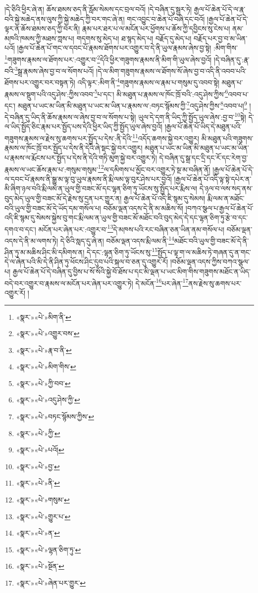 །དེ་ཅིའི་ཕྱིར་ཞེ་ན། ཆོས་ཐམས་ཅད་ནི་རློམ་སེམས་དང་བྲལ་བའོ། །དེ་བཞིན་དུ་སྦྱར་ཏེ། རྒྱལ་པོ་ཆེན་པོ་དེ་ལ་རྣ་བའི་སྐྱེ་མཆེད་ནས་ལུས་ཀྱི་སྐྱེ་མཆེད་ཀྱི་བར་གང་ཞེ་ན། གང་འབྱུང་བ་ཆེན་པོ་བཞི་དང་བའོ། །རྒྱལ་པོ་ཆེན་པོ་དེ་ལྟར་ན་ཆོས་ཐམས་ཅད་ཀྱི་བར་ནི། རྣམ་པར་ཐར་པ་ལ་མངོན་པར་ཕྱོགས་པ་ཆོས་ཀྱི་དབྱིངས་སུ་ངེས་པ། ནམ་མཁའི་ཁམས་ཀྱི་མཐས་ཀླས་པ། གདགས་སུ་མེད་པ། ཐ་སྙད་མེད་པ། བརྗོད་དུ་མེད་པ། བརྗོད་པར་བྱ་བ་མ་ཡིན་པའོ། །རྒྱལ་པོ་ཆེན་པོ་གང་ལ་དབང་པོ་རྣམས་ཐོགས་པར་འགྱུར་བ་དེ་ནི་ཡུལ་རྣམས་ཞེས་བྱ་སྟེ། :མིག་གིས་\footnote{«སྣར་»«པེ་»མིག་ནི་}གཟུགས་རྣམས་ལ་ཐོགས་པར་:འགྱུར་བ་\footnote{«སྣར་»«པེ་»འགྱུར་བས་}དེའི་ཕྱིར་གཟུགས་རྣམས་ནི་མིག་གི་ཡུལ་ཞེས་བྱའོ། །དེ་བཞིན་དུ་:རྣ་བའི་\footnote{«སྣར་»«པེ་»རྣ་བ་ནི་}སྒྲ་རྣམས་ཞེས་བྱ་བ་ལ་སོགས་པའོ། །དེ་ལ་མིག་གཟུགས་རྣམས་ལ་ཐོགས་སོ་ཞེས་བྱ་བ་འདི་ནི་འབབ་པའི་ཐོགས་པར་འགྱུར་བར་བསྟན་ཏེ། འདི་ལྟར་:མིག་ནི་\footnote{«སྣར་»«པེ་»མིག་གིས་}གཟུགས་རྣམས་ལ་རྣམ་པ་གསུམ་དུ་འབབ་སྟེ། མཐུན་པ་རྣམས་ལ་སྡུག་པའི་འདུ་ཤེས་:ཀྱིས་འབབ་\footnote{«སྣར་»«པེ་»ཀྱི་བབ་}པ་དང་། མི་མཐུན་པ་རྣམས་ལ་ཁོང་ཁྲོ་བའི་:འདུ་ཤེས་ཀྱིས་\footnote{«སྣར་»«པེ་»འདུ་ཤེས་ཀྱི་}འབབ་པ་དང་། མཐུན་པ་ཡང་མ་ཡིན་མི་མཐུན་པ་ཡང་མ་ཡིན་པ་རྣམས་ལ་:བཏང་སྙོམས་ཀྱི་\footnote{«སྣར་»«པེ་»བཏང་སྙོམས་ཀྱིས་}འདུ་ཤེས་ཀྱིས་\footnote{«སྣར་»«པེ་»ཀྱི་}འབབ་པ།\footnote{«སྣར་»«པེ་»པའོ།} །དེ་བཞིན་དུ་ཡིད་ནི་ཆོས་རྣམས་ལ་ཞེས་བྱ་བ་ལ་སོགས་པ་སྟེ། ཡུལ་དེ་དག་ནི་ཡིད་ཀྱི་སྤྱོད་ཡུལ་ཞེས་:བྱ་བ་\footnote{«སྣར་»«པེ་»བྱ་}སྟེ། དེ་ལ་ཡིད་སྤྱོད་ཅིང་རྣམ་པར་སྤྱོད་པས་དེའི་ཕྱིར་ཡིད་ཀྱི་སྤྱོད་ཡུལ་ཞེས་བྱའོ། །རྒྱལ་པོ་ཆེན་པོ་ཡིད་དེ་མཐུན་པའི་གཟུགས་རྣམས་ལ་རྗེས་སུ་ཆགས་པར་སྤྱོད་པ་དེས་:ནི་དེའི་\footnote{«སྣར་»«པེ་»ནི་}འདོད་ཆགས་སྐྱེ་བར་འགྱུར། མི་མཐུན་པའི་གཟུགས་རྣམས་ལ་ཁོང་ཁྲོ་བར་སྤྱོད་པ་དེས་ནི་དེའི་ཞེ་སྡང་སྐྱེ་བར་འགྱུར། མཐུན་པ་ཡང་མ་ཡིན་མི་མཐུན་པ་ཡང་མ་ཡིན་པ་རྣམས་ལ་རྨོངས་པར་སྤྱོད་པ་དེས་ནི་དེའི་གཏི་མུག་སྐྱེ་བར་འགྱུར་ཏེ། དེ་བཞིན་དུ་སྒྲ་དང་དྲི་དང་རོ་དང་རེག་བྱ་རྣམས་ལ་ཡང་ཆོས་རྣམ་པ་:གསུམ་གསུམ་\footnote{«སྣར་»«པེ་»གསུམ་}ལ་དམིགས་པ་མྱོང་བར་འགྱུར་ཏེ་སྔ་མ་བཞིན་ནོ། །རྒྱལ་པོ་ཆེན་པོ་དེ་ལ་དབང་པོ་རྣམས་ནི་སྒྱུ་མ་ལྟ་བུ་ཡུལ་རྣམས་ནི་རྨི་ལམ་ལྟ་བུར་ཤེས་པར་བྱའོ། །རྒྱལ་པོ་ཆེན་པོ་འདི་ལྟ་སྟེ་དཔེར་ན་མི་ཞིག་ཉལ་བའི་རྨི་ལམ་ན་ཡུལ་གྱི་བཟང་མོ་དང་ལྷན་ཅིག་ཏུ་ཡོངས་སུ་སྤྱོད་པར་རྨིས་ལ། དེ་ཉལ་བ་ལས་སད་ནས་བུད་མེད་ཡུལ་གྱི་བཟང་མོ་དེ་རྗེས་སུ་དྲན་པར་གྱུར་ན། རྒྱལ་པོ་ཆེན་པོ་འདི་ཇི་སྙམ་དུ་སེམས། རྨི་ལམ་ན་མཐོང་བའི་ཡུལ་གྱི་བཟང་མོ་དེ་ཡོད་དམ་གསོལ་པ། བཅོམ་ལྡན་འདས་དེ་ནི་མ་མཆིས་སོ། །བཀའ་སྩལ་པ་རྒྱལ་པོ་ཆེན་པོ་འདི་ཇི་སྙམ་དུ་སེམས་སྐྱེས་བུ་གང་རྨི་ལམ་ན་ཡུལ་གྱི་བཟང་མོ་མཐོང་བའི་བུད་མེད་དེ་དང་ལྷན་ཅིག་ཏུ་རྩེ་བ་དང་དགའ་བ་དང་། མངོན་པར་ཞེན་པར་:འགྱུར་བ་\footnote{«སྣར་»«པེ་»གྱུར་པ་}དེ་མཁས་པའི་རང་བཞིན་ཅན་ཡིན་ནམ་གསོལ་པ། བཅོམ་ལྡན་འདས་དེ་ནི་མ་ལགས་ཏེ། དེ་ཅིའི་སླད་དུ་ཞེ་ན། བཅོམ་ལྡན་འདས་རྨི་ལམ་ནི་\footnote{«སྣར་»«པེ་»ན་}མཐོང་བའི་ཡུལ་གྱི་བཟང་མོ་དེ་ནི་ཤིན་ཏུ་མ་མཆིས་ཤིང་མི་དམིགས་ན། དེ་དང་:ལྷན་ཅིག་ཏུ་ཡོངས་སུ་\footnote{«སྣར་»«པེ་»ལྷན་ཅིག་ཏུ་}སྤྱོད་པ་ལྟ་ག་ལ་མཆིས་ཏེ་གཞན་དུ་ན་གང་དེ་ལ་ཞེན་པའི་མི་དེ་ནི་ཤིན་ཏུ་ཕོངས་ཤིང་དུབ་པའི་སྐལ་བ་ཅན་དུ་འགྱུར་རོ། །བཅོམ་ལྡན་འདས་ཀྱིས་བཀའ་སྩལ་པ། རྒྱལ་པོ་ཆེན་པོ་དེ་བཞིན་དུ་བྱིས་པ་སོ་སོའི་སྐྱེ་བོ་ཐོས་པ་དང་མི་ལྡན་པ་ཡང་མིག་གིས་གཟུགས་མཐོང་ན་ཡིད་བདེ་བར་འགྱུར་བ་རྣམས་ལ་མངོན་པར་ཞེན་པར་འགྱུར་ཏེ། དེ་མངོན་\footnote{«སྣར་»«པེ་»སྔོན་}པར་ཞེན་\footnote{«སྣར་»«པེ་»ཞེན་པར་གྱུར་}ནས་རྗེས་སུ་ཆགས་པར་འགྱུར་རོ། །

